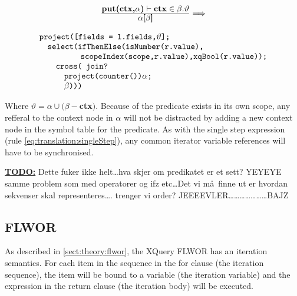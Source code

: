 \begin{equation}
\centering
\begin{array}{c}
	\frac{\displaystyle \textbf{put(ctx,}\alpha\textbf{)}\vdash\textbf{ctx}\in\beta.\vartheta}
	{\displaystyle \alpha\textsf{[}\beta\textsf{]}}

	\Longrightarrow 
	\\
	\mbox{}
	\\
	\begin{array}{l}
		\mbox{\texttt{project([fields = l.fields,}} \vartheta \mbox{\texttt{];}} 
		\\ \quad \mbox{\texttt{select(ifThenElse(isNumber(r.value),}} \\ \quad 
		\qquad\qquad \mbox{\texttt{scopeIndex(scope,r.value),xqBool(r.value));}} \\ \quad\quad
		\mbox{\texttt{cross( join?}} \\ \quad\quad\quad
		\mbox{\texttt{project(counter())}}\alpha \texttt{;} \\ \quad\quad\quad
		\beta \mbox{\texttt{)))}}
	\end{array}
\end{array}
\label{eq:translation:iterationPredicate}
\end{equation}

Where $\vartheta = \alpha \cup (\beta -$\textbf{ctx}$)$. Because of the predicate exists in its own scope, any
refferal to the context node in $\alpha$ will not be distracted by adding a new context node in the symbol table
for the predicate. As with the single step expression (rule \ref{eq:translation:singleStep}), any common iterator
variable references will have to be synchronised.

\textbf{\underline{\Large TODO:}} Dette fuker ikke helt\ldots hva skjer om predikatet er et sett? YEYEYE samme
problem som med operatorer og ifz etc\ldots Det vi m\aa~finne ut er hvordan sekvenser skal representeres\ldots.
trenger vi order? JEEEEVLER\ldots\ldots\ldots\ldots\ldots\ldots\ldots  BAJZ


\subsection{FLWOR}
\label{sect:translation:mXr:iteration}
As described in \ref{sect:theory:flwor}, the XQuery FLWOR has an iteration semantics. For each item in the
sequence in the \textsf{for} clause (the iteration sequence), the item will be bound to a variable (the iteration
variable) and the expression in the \textsf{return} clause (the iteration body) will be executed.

